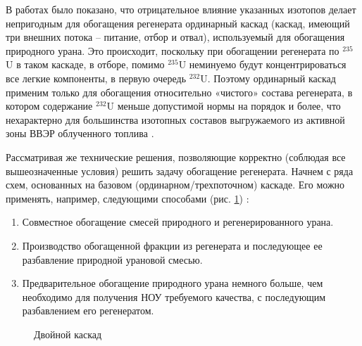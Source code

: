 В работах \cite{sulaberidzeNekotoryhRazdelitelnyhProblemah2004,sulaberidzeProblemsRefinementRecycled4, smirnovKaskadnyeShemyZadachah2012} было показано, что отрицательное влияние указанных изотопов делает непригодным для обогащения регенерата ординарный каскад (каскад, имеющий три внешних потока – питание, отбор и отвал), используемый для обогащения природного урана. Это происходит, поскольку при обогащении регенерата по $^{235}$U в таком каскаде, в отборе, помимо $^{235}$U неминуемо будут концентрироваться все легкие компоненты, в первую очередь $^{232}$U. Поэтому ординарный каскад применим только для обогащения относительно «чистого» состава регенерата, в котором содержание $^{232}$U меньше допустимой нормы на порядок и более, что нехарактерно для большинства изотопных составов выгружаемого из активной зоны ВВЭР облученного топлива \cite{bormanTehnikoekonomicheskiyAnalizVozmozhnyh2012}.

Рассматривая же технические решения, позволяющие корректно (соблюдая все вышеозначенные условия) решить задачу обогащение регенерата. Начнем с ряда схем, основанных на базовом (ординарном/трехпоточном) каскаде.
Его можно применять, например, следующими способами (рис. \ref{fig:diagram1}) \cite{smirnovKaskadnyeShemyZadachah2012}:
\begin{enumerate}
  \item Совместное обогащение смесей природного и регенерированного урана.
  \item Производство обогащенной фракции из регенерата и последующее ее разбавление природной урановой смесью.
  \item Предварительное обогащение природного урана немного больше, чем необходимо для получения НОУ требуемого качества, с последующим разбавлением его регенератом.
\end{enumerate}

\begin{figure}[ht]
  \caption{Двойной каскад}\label{fig:diagram1}
\end{figure}

